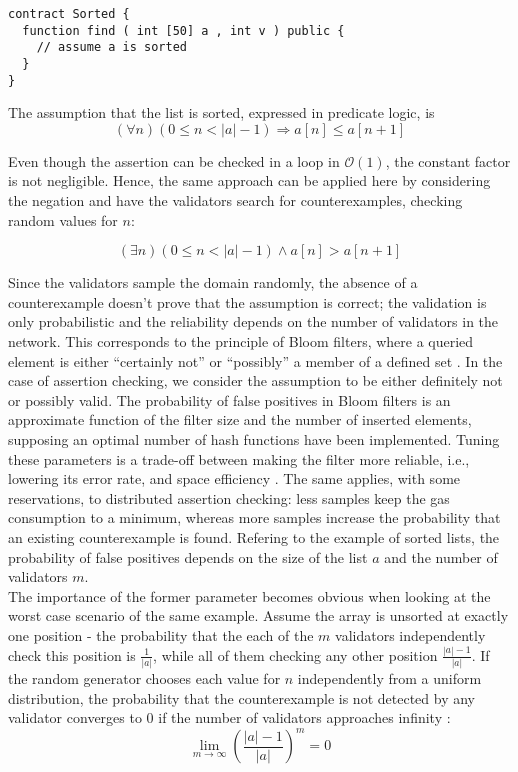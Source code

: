 \begin{lstlisting}[caption=Smart contract expecting a sorted array, numbers=none, language=Solidity, label=lst:sorted]
contract Sorted {
  function find ( int [50] a , int v ) public {
    // assume a is sorted
  }
}
\end{lstlisting}
 
The assumption that the list is sorted, expressed in predicate logic, is
\begin{equation}\label{eq:sorted}
	(\forall n) (0 \leq n < |a| - 1) \Rightarrow a[n] \leq a[n+1]
\end{equation}

Even though the assertion can be checked in a loop in $\mathcal{O}(1)$, the constant factor is not negligible. Hence, the same approach can be applied here by considering the negation and have the validators search for counterexamples, checking random values for $n$:
 
\begin{equation}\label{eq:sorted_neg}
	(\exists n) (0 \leq n < |a| - 1) \wedge a[n] > a[n+1]
\end{equation}

Since the validators sample the domain randomly, the absence of a counterexample doesn't prove that the assumption is correct; the validation is only probabilistic and the reliability depends on the number of validators in the network. This corresponds to the principle of Bloom filters, where a queried element is either ``certainly not'' or ``possibly'' a member of a defined set \cite{blustein_bloom_2002}. In the case of assertion checking, we consider the assumption to be either definitely not or possibly valid. The probability of false positives in Bloom filters is an approximate function of the filter size and the number of inserted elements, supposing an optimal number of hash functions have been implemented. Tuning these parameters is a trade-off between making the filter more reliable, i.e., lowering its error rate, and space efficiency \cite{blustein_bloom_2002}. The same applies, with some reservations, to distributed assertion checking: less samples keep the gas consumption to a minimum, whereas more samples increase the probability that an existing counterexample is found. Refering to the example of sorted lists,  the probability of false positives depends on the size of the list $a$ and the number of validators $m$.\\
The importance of the former parameter becomes obvious when looking at the worst case scenario of the same example. Assume the array is unsorted at exactly one position - the probability that the each of the $m$ validators independently check this position is $\frac{1}{|a|}$, while all of them checking any other position $\frac{|a|-1}{|a|}$. If the random generator chooses each value for $n$ independently from a uniform distribution, the probability that the counterexample is not detected by any validator converges to 0 if the number of validators approaches infinity \cite{thiemann_2020}:
\begin{equation}\label{eq:limes_validators}
	\lim_{m\to\infty} \left(\frac{|a|-1}{|a|}\right)^m = 0
\end{equation}

